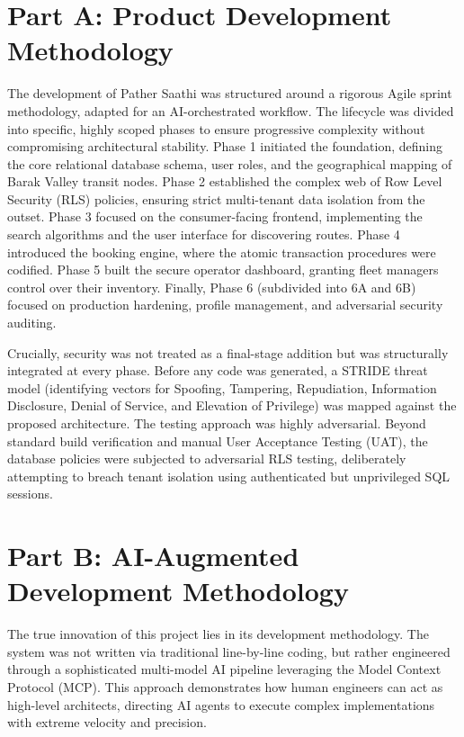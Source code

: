\documentclass[12pt,a4paper]{report}
\begin{document}
\section{Part A: Product Development Methodology}
The development of Pather Saathi was structured around a rigorous Agile sprint methodology, adapted for an AI-orchestrated workflow. The lifecycle was divided into specific, highly scoped phases to ensure progressive complexity without compromising architectural stability. Phase 1 initiated the foundation, defining the core relational database schema, user roles, and the geographical mapping of Barak Valley transit nodes. Phase 2 established the complex web of Row Level Security (RLS) policies, ensuring strict multi-tenant data isolation from the outset. Phase 3 focused on the consumer-facing frontend, implementing the search algorithms and the user interface for discovering routes. Phase 4 introduced the booking engine, where the atomic transaction procedures were codified. Phase 5 built the secure operator dashboard, granting fleet managers control over their inventory. Finally, Phase 6 (subdivided into 6A and 6B) focused on production hardening, profile management, and adversarial security auditing. 

Crucially, security was not treated as a final-stage addition but was structurally integrated at every phase. Before any code was generated, a STRIDE threat model (identifying vectors for Spoofing, Tampering, Repudiation, Information Disclosure, Denial of Service, and Elevation of Privilege) was mapped against the proposed architecture. The testing approach was highly adversarial. Beyond standard build verification and manual User Acceptance Testing (UAT), the database policies were subjected to adversarial RLS testing, deliberately attempting to breach tenant isolation using authenticated but unprivileged SQL sessions.

\section{Part B: AI-Augmented Development Methodology}
The true innovation of this project lies in its development methodology. The system was not written via traditional line-by-line coding, but rather engineered through a sophisticated multi-model AI pipeline leveraging the Model Context Protocol (MCP). This approach demonstrates how human engineers can act as high-level architects, directing AI agents to execute complex implementations with extreme velocity and precision.
\end{document}
